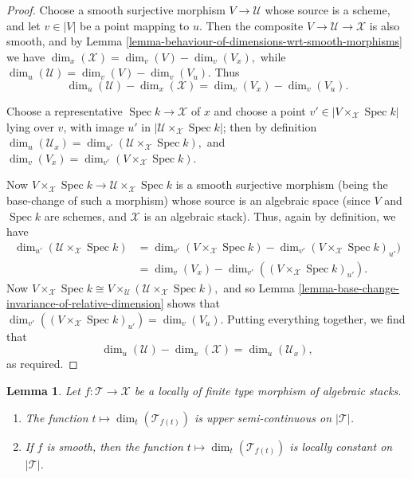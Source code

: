 \documentclass{stacks-project}
\theoremstyle{plain}
\newtheorem{lemma}[subsection]{Lemma}
\theoremstyle{definition}
\theoremstyle{remark}
\numberwithin{equation}{subsection}
\def\Spec{\mathop{\mathrm{Spec}}}
\begin{document}
\begin{proof}
Choose a smooth surjective morphism $V \to \mathcal{U}$ whose source
is a scheme, and let $v\in |V|$ be a point mapping to $u$.
Then the composite $V \to \mathcal{U} \to \mathcal{X}$ is also smooth,
and by Lemma \ref{lemma-behaviour-of-dimensions-wrt-smooth-morphisms}
we have $\dim_x(\mathcal{X}) = \dim_v(V) - \dim_v(V_x),$
while $\dim_u(\mathcal{U}) = \dim_v(V) - \dim_v(V_u).$
Thus
$$
\dim_u(\mathcal{U}) - \dim_x(\mathcal{X}) = \dim_v (V_x) - \dim_v (V_u).
$$

\medskip\noindent
Choose a representative $\Spec k \to \mathcal{X}$ of $x$
and choose a point $v' \in | V \times_{\mathcal{X}} \Spec k|$ lying over
$v$, with image $u'$ in $|\mathcal{U}\times_{\mathcal{X}} \Spec k|$;
then by definition
$\dim_u(\mathcal{U}_x) = \dim_{u'}(\mathcal{U}\times_{\mathcal{X}} \Spec k),$
and
$\dim_v(V_x) = \dim_{v'}(V\times_{\mathcal{X}} \Spec k).$

\medskip\noindent
Now $V\times_{\mathcal{X}} \Spec k \to \mathcal{U}\times_{\mathcal{X}}\Spec k$
is a smooth surjective morphism (being the base-change
of such a morphism) whose source is an algebraic space
(since $V$ and $\Spec k$ are schemes, and $\mathcal{X}$
is an algebraic stack).  Thus, again by definition,
we have
\begin{align*}
\dim_{u'}(\mathcal{U}\times_{\mathcal{X}} \Spec k)
& =
\dim_{v'}(V\times_{\mathcal{X}} \Spec k) -
\dim_{v'}(V \times_{\mathcal{X}} \Spec k)_{u'}) \\
& = \dim_v(V_x) -
\dim_{v'}( (V\times_{\mathcal{X}} \Spec k)_{u'}).
\end{align*}
Now $V\times_{\mathcal{X}} \Spec k \cong
V\times_{\mathcal{U}} (\mathcal{U}\times_{\mathcal{X}} \Spec k),$
and so
Lemma \ref{lemma-base-change-invariance-of-relative-dimension}
shows that
$\dim_{v'}((V\times_{\mathcal{X}} \Spec k)_{u'})  = \dim_v(V_u).$
Putting everything together, we find that
$$
\dim_u(\mathcal{U}) - \dim_x(\mathcal{X}) =
\dim_u(\mathcal{U}_x),
$$
as required.
\end{proof}

\begin{lemma}
\label{lemma-relative-dimension-is-semi-continuous}
Let $f: \mathcal{T} \to \mathcal{X}$ be a locally of finite type morphism of
algebraic stacks.
\begin{enumerate}
\item
The function $t \mapsto \dim_t(\mathcal{T}_{f(t)})$ is upper semi-continuous
on $|\mathcal{T}|$.
\item If $f$ is smooth, then
the function $t \mapsto \dim_t(\mathcal{T}_{f(t)})$ is locally constant
on $|\mathcal{T}|$.
\end{enumerate}
\end{lemma}
\end{document}

